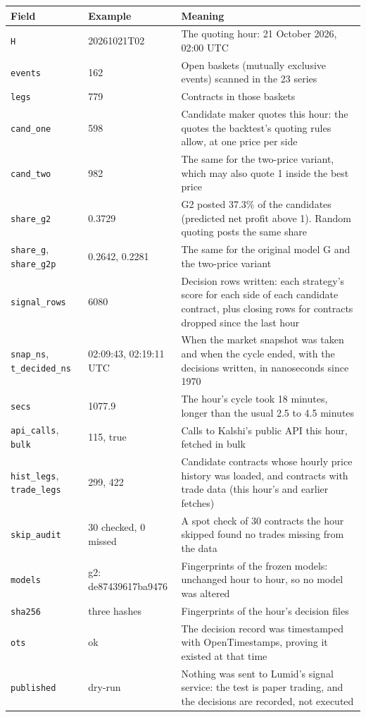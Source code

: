 \documentclass[11pt,a4paper]{article}
\newcommand{\job}[1]{\texttt{#1}}
\newcommand{\cent}{\textcent}
\begin{document}
{\small
\begin{xltabular}{\textwidth}{@{}P{3.9cm} P{3.4cm} L@{}}
\toprule
Field & Example & Meaning \\
\midrule
\endhead
\job{H} & 20261021T02 & The quoting hour: 21 October 2026, 02:00 UTC \\
\job{events} & 162 & Open baskets (mutually exclusive events) scanned in the 23 series \\
\job{legs} & 779 & Contracts in those baskets \\
\job{cand\_one} & 598 & Candidate maker quotes this hour: the quotes the backtest's quoting rules allow, at one price
  per side \\
\job{cand\_two} & 982 & The same for the two-price variant, which may also quote 1\cent{} inside the best price \\
\job{share\_g2} & 0.3729 & G2 posted 37.3\% of the candidates (predicted net profit above 1\cent). Random quoting
  posts the same share \\
\job{share\_g}, \job{share\_g2p} & 0.2642, 0.2281 & The same for the original model G and the two-price
  variant \\
\job{signal\_rows} & 6080 & Decision rows written: each strategy's score for each side of each candidate contract,
  plus closing rows for contracts dropped since the last hour \\
\job{snap\_ns}, \job{t\_decided\_ns} & 02:09:43, 02:19:11 UTC & When the market snapshot was taken and when the
  cycle ended, with the decisions written, in nanoseconds since 1970 \\
\job{secs} & 1077.9 & The hour's cycle took 18 minutes, longer than the usual 2.5 to 4.5 minutes \\
\job{api\_calls}, \job{bulk} & 115, true & Calls to Kalshi's public API this hour, fetched in bulk \\
\job{hist\_legs}, \job{trade\_legs} & 299, 422 & Candidate contracts whose hourly price history was loaded,
  and contracts with trade data (this hour's and earlier fetches) \\
\job{skip\_audit} & 30 checked, 0 missed & A spot check of 30 contracts the hour skipped found no trades missing
  from the data \\
\job{models} & g2: de87439617ba9476 & Fingerprints of the frozen models: unchanged hour to hour, so no model was
  altered \\
\job{sha256} & three hashes & Fingerprints of the hour's decision files \\
\job{ots} & ok & The decision record was timestamped with OpenTimestamps, proving it existed at that time \\
\job{published} & dry-run & Nothing was sent to Lumid's signal service: the test is paper trading, and the decisions
  are recorded, not executed \\
\bottomrule
\end{xltabular}
}
\end{document}
